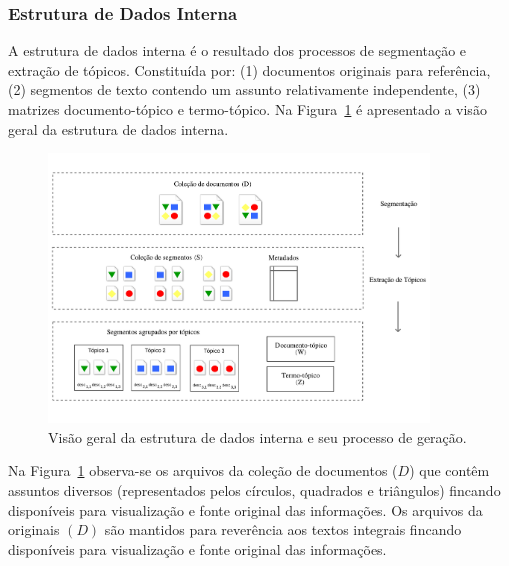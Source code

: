 






\subsubsection{Estrutura de Dados Interna}

A estrutura de dados interna é o resultado dos processos de segmentação e extração de tópicos. Constituída por: 
(1) documentos originais para referência, 
(2) segmentos de texto contendo um assunto relativamente independente,
(3) matrizes documento-tópico e termo-tópico.
Na Figura~\ref{fig:estrutura-dados-interna} é apresentado a visão geral da estrutura de dados interna. 





	\begin{figure}[h!]
\center
		\includegraphics[trim={ 0 40 0 40 },clip,page=1,width=0.9\textwidth]{conteudo/capitulos/figs/estrutura-de-dados-interna.pdf}

		\caption{Visão geral da estrutura de dados interna e seu processo de geração.}
		\label{fig:estrutura-dados-interna}
	\end{figure}



Na Figura~\ref{fig:estrutura-dados-interna} observa-se os arquivos da coleção de documentos ($D$) que contêm assuntos diversos (representados pelos círculos, quadrados e triângulos) fincando disponíveis para visualização e fonte original das informações. Os arquivos da originais $(D)$ são mantidos para reverência aos textos integrais fincando disponíveis para visualização e fonte original das informações. 

